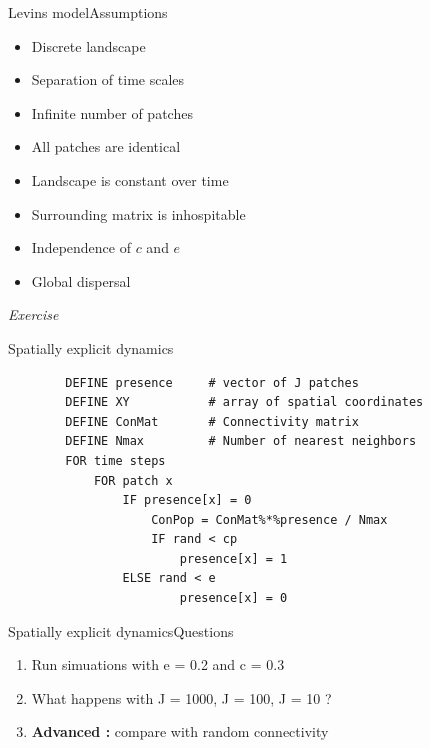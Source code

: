 \documentclass[10pt,aspectratio=149]{beamer}
\begin{document}

\begin{frame}{Levins model}{Assumptions}

    \begin{itemize}
        \item Discrete landscape
        \item Separation of time scales 
        \item Infinite number of patches
        \item All patches are identical
        \item Landscape is constant over time
        \item Surrounding matrix is inhospitable
        \item Independence of $c$ and $e$
        \item Global dispersal 
    \end{itemize}
    
\end{frame}


{
\usebackgroundtemplate{}
\begin{frame}

	\pagecolor{BDQC1st}
	\color{white}

	\LARGE{\textit{Exercise}}

\end{frame}
}


\begin{frame}[fragile]{Spatially explicit dynamics}

    \begin{verbatim}
        DEFINE presence     # vector of J patches
        DEFINE XY           # array of spatial coordinates
        DEFINE ConMat       # Connectivity matrix
        DEFINE Nmax         # Number of nearest neighbors
        FOR time steps            
            FOR patch x
                IF presence[x] = 0 
                    ConPop = ConMat%*%presence / Nmax
                    IF rand < cp 
                        presence[x] = 1
                ELSE rand < e
                        presence[x] = 0
    \end{verbatim}

\end{frame}


\begin{frame}[fragile]{Spatially explicit dynamics}{Questions}

    \begin{enumerate}
        \item Run simuations with e = 0.2 and c = 0.3
        \item What happens with J = 1000, J = 100, J = 10 ?
        \item \textbf{Advanced :} compare with random connectivity
    \end{enumerate}

\end{frame}
\end{document}
